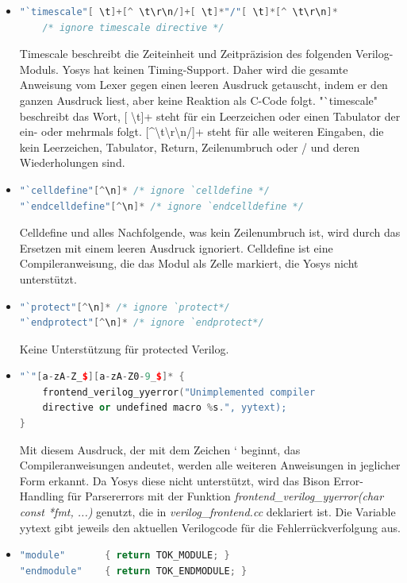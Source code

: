 \documentclass[11pt]{report}
\begin{document}
\begin{itemize}
\item
\begin{lstlisting}[language=C++]
"`timescale"[ \t]+[^ \t\r\n/]+[ \t]*"/"[ \t]*[^ \t\r\n]* 
	/* ignore timescale directive */
\end{lstlisting}
Timescale beschreibt die Zeiteinheit und Zeitpräzision des folgenden Verilog-Moduls. Yosys hat keinen Timing-Support. Daher wird die gesamte Anweisung vom Lexer gegen einen leeren Ausdruck getauscht, indem er den ganzen Ausdruck liest, aber keine Reaktion als C-Code folgt.
"`timescale" beschreibt das Wort, [ \textbackslash{t}]+ steht für ein Leerzeichen oder einen Tabulator der ein- oder mehrmals folgt. 
[\textasciicircum\space\textbackslash{t}\textbackslash{r}\textbackslash{n}/]+ steht für alle weiteren Eingaben, die kein Leerzeichen, Tabulator, Return, Zeilenumbruch oder / und deren Wiederholungen sind.
\item
\begin{lstlisting}[language=C++]
"`celldefine"[^\n]* /* ignore `celldefine */
"`endcelldefine"[^\n]* /* ignore `endcelldefine */
\end{lstlisting}
Celldefine und alles Nachfolgende, was kein Zeilenumbruch ist, wird durch das Ersetzen mit einem leeren Ausdruck ignoriert.
Celldefine ist eine Compileranweisung, die das Modul als Zelle markiert, die Yosys nicht unterstützt.
\item
\begin{lstlisting}[language=C++]
"`protect"[^\n]* /* ignore `protect*/
"`endprotect"[^\n]* /* ignore `endprotect*/
\end{lstlisting}
Keine Unterstützung für protected Verilog.
\item
\begin{lstlisting}[language=C++]
"`"[a-zA-Z_$][a-zA-Z0-9_$]* {
	frontend_verilog_yyerror("Unimplemented compiler
	directive or undefined macro %s.", yytext);
}
\end{lstlisting}
Mit diesem Ausdruck, der mit dem Zeichen ` beginnt, das Compileranweisungen andeutet, werden alle weiteren Anweisungen in jeglicher Form erkannt. Da Yosys diese nicht unterstützt, wird das Bison Error-Handling für Parsererrors mit der Funktion \textit{frontend\_verilog\_yyerror(char const *fmt, ...)} genutzt, die in \textit{verilog\_frontend.cc} deklariert ist. Die Variable yytext gibt jeweils den aktuellen Verilogcode für die Fehlerrückverfolgung aus. 
\item
\begin{lstlisting}[language=C++]
"module"       { return TOK_MODULE; }
"endmodule"    { return TOK_ENDMODULE; }

\end{lstlisting}
\end{itemize}
\end{document}
